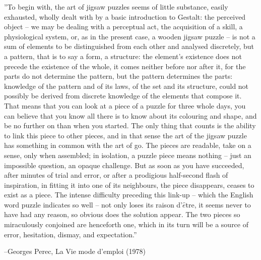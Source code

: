 

\vspace*{\fill}



''To begin with, the art of jigsaw puzzles seems of little substance, easily exhausted, wholly dealt with by a basic introduction to Gestalt: the perceived object -- we may be dealing with a perceptual act, the acquisition of a skill, a physiological system, or, as in the present case, a wooden jigsaw puzzle -- is not a sum of elements to be distinguished from each other and analysed discretely, but a pattern, that is to say a form, a structure: the element's existence does not precede the existence of the whole, it comes neither before nor after it, for the parts do not determine the pattern, but the pattern determines the parts: knowledge of the pattern and of its laws, of the set and its structure, could not possibly be derived from discrete knowledge of the elements that compose it. That means that you can look at a piece of a puzzle for three whole days, you can believe that you know all there is to know about its colouring and shape, and be no further on than when you started. The only thing that counts is the ability to link this piece to other pieces, and in that sense the art of the jigsaw puzzle has something in common with the art of go. The pieces are readable, take on a sense, only when assembled; in isolation, a puzzle piece means nothing -- just an impossible question, an opaque challenge. But as soon as you have succeeded, after minutes of trial and error, or after a prodigious half-second flash of inspiration, in fitting it into one of its neighbours, the piece disappears, ceases to exist as a piece. The intense difficulty preceding this link-up -- which the English word puzzle indicates so well -- not only loses its raison d'$\hat{e}$tre, it seems never to have had any reason, so obvious does the solution appear. The two pieces so miraculously conjoined are henceforth one, which in its turn will be a source of error, hesitation, dismay, and expectation.''
\\
\begin{flushright}
--Georges Perec, La Vie mode d'emploi (1978)
\end{flushright}
\vspace*{\fill}